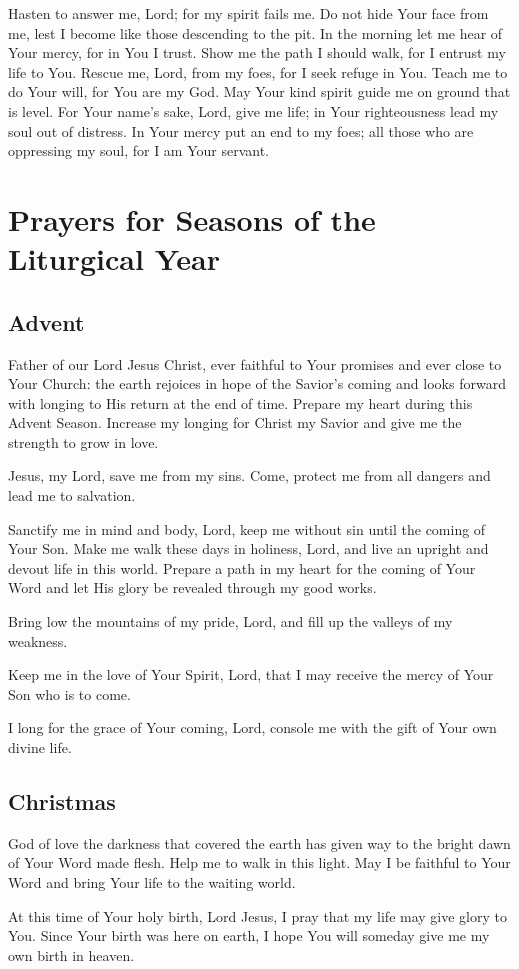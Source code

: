 \documentclass[12pt]{article}
\newcommand{\prayersection}[1]{\section{#1}}
\newcommand{\prayertitle}[1]{\subsection{#1}}
\begin{document}
Hasten to answer me, Lord;
for my spirit fails me.
Do not hide Your face from me,
lest I become like those descending to the pit.
In the morning let me hear of Your mercy, for in You I trust.
Show me the path I should walk, for I entrust my life to You.
Rescue me, Lord, from my foes, for I seek refuge in You.
Teach me to do Your will, for You are my God.
May Your kind spirit guide me on ground that is level.
For Your name’s sake, Lord, give me life;
in Your righteousness lead my soul out of distress.
In Your mercy put an end to my foes;
all those who are oppressing my soul, for I am Your servant.


\newpage

\prayersection{Prayers for Seasons of the Liturgical Year}
\prayertitle{Advent}
Father of our Lord Jesus Christ, ever faithful to Your promises and ever close to Your Church: the earth rejoices in hope of the Savior's coming and looks forward with longing to His return at the end of time.
Prepare my heart during this Advent Season.
Increase my longing for Christ my Savior and give me the strength to grow in love.

Jesus, my Lord, save me from my sins.
Come, protect me from all dangers and lead me to salvation.

Sanctify me in mind and body, Lord, keep me without sin until the coming of Your Son.
Make me walk these days in holiness, Lord, and live an upright and devout life in this world.
Prepare a path in my heart for the coming of Your Word and let His glory be revealed through my good works.

Bring low the mountains of my pride, Lord, and fill up the valleys of my weakness.

Keep me in the love of Your Spirit, Lord, that I may receive the mercy of Your Son who is to come.

I long for the grace of Your coming, Lord, console me with the gift of Your own divine life.

\prayertitle{Christmas}
God of love the darkness that covered the earth has given way to the bright dawn of Your Word made flesh.
Help me to walk in this light.
May I be faithful to Your Word and bring Your life to the waiting world.

At this time of Your holy birth, Lord Jesus, I pray that my life may give glory to You.
Since Your birth was here on earth, I hope You will someday give me my own birth in heaven.
\end{document}
